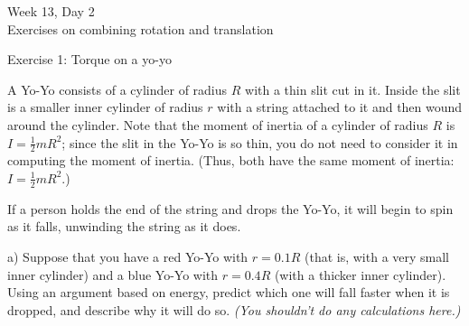 \documentclass[12pt]{article}
\begin{document}
\Large

\begin{center}
	Week 13, Day 2 \\
	Exercises on combining rotation and translation
	
	\large
	
	\medskip
	
	Exercise 1: Torque on a yo-yo
	
\end{center}

\normalsize

\begin{minipage}{0.6\textwidth}
A Yo-Yo consists of a cylinder of radius $R$ with a thin slit cut in it. Inside the slit is a smaller inner cylinder of radius $r$ with a string attached to it and then wound around the cylinder. Note that the moment of inertia of a cylinder of radius $R$ is $I=\frac{1}{2}mR^2$; since the slit in the Yo-Yo is so thin, you do not need to consider it in computing the moment of inertia. (Thus, both have the same moment of inertia: $I=\frac{1}{2}mR^2$.)

If a person holds the end of the string and drops the Yo-Yo, it will begin to spin as it falls, unwinding the string as it does. 

\bigskip\bigskip

a) Suppose that you have a red Yo-Yo with $r=0.1 R$ (that is, with a very small inner cylinder) and a blue Yo-Yo with $r=0.4 R$ (with a thicker inner cylinder). Using an argument based on energy, predict which one will fall faster when it is dropped, and describe why it will do so. \textit{(You shouldn't do any calculations here.)}
\end{minipage}
\end{document}
